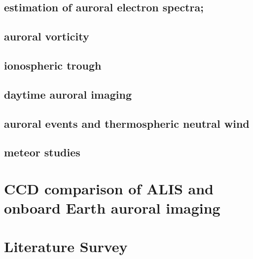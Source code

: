 \subsection{estimation of auroral electron spectra;}

\subsection{auroral vorticity}

\subsection{ionospheric trough}

\subsection{daytime auroral imaging}

\subsection{auroral events and thermospheric neutral wind}

\subsection{meteor studies}



\section{CCD comparison of ALIS and onboard Earth auroral imaging}


\section{Literature Survey}




